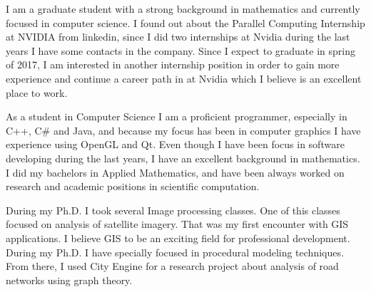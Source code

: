 \documentclass[10pt,stdletter,dateno,sigleft,letterpaper]{newlfm} %
\begin{document}
\begin{newlfm}



I am a graduate student with a strong background in mathematics and currently focused in computer science. I found out about the Parallel Computing Internship at NVIDIA from linkedin, since I did two internships at Nvidia during the last years I have some contacts in the company. Since I expect to graduate in spring of 2017, I am interested in another internship position in order to gain more experience and continue a career path in at Nvidia which I believe is an excellent place to work.

As a student in Computer Science I am a proficient programmer, especially in C++, C\# and Java, and because my focus has been in computer graphics I have experience using OpenGL and Qt. Even though I have been focus in software developing during the last years, I have an excellent background in mathematics. I did my bachelors in Applied Mathematics, and have been always worked on research and academic positions in scientific computation.

During my Ph.D. I took several Image processing classes. One of this classes focused on analysis of satellite imagery. That was my first encounter with GIS applications. I believe GIS to be an exciting field for professional development. During my Ph.D. I have specially focused in procedural modeling techniques. From there, I used City Engine for a research project about analysis of road networks using graph theory.


\end{newlfm}
\end{document}
